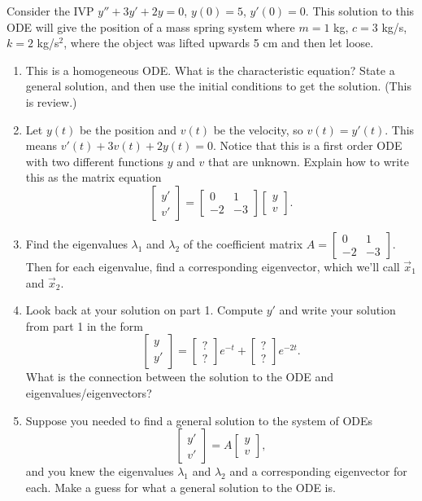 \begin{problem}
 Consider the IVP $y''+3y'+2y=0$, $y(0)=5$, $y'(0)=0$. This solution to this ODE will give the position of a mass spring system where $m=1$ kg, $c=3$ kg/s, $k=2$ kg/s$^2$, where the object was lifted upwards 5 cm and then let loose. 
\begin{enumerate}
\item This is a homogeneous ODE. What is the characteristic equation? State a general solution, and then use the initial conditions to get the solution.  (This is review.)
\item Let $y(t)$ be the position and $v(t)$ be the velocity, so $v(t)=y'(t)$.  This means $v'(t)+3v(t)+2y(t)=0$.  Notice that this is a first order ODE with two different functions $y$ and $v$ that are unknown. Explain how to write this as the matrix equation
$$
\begin{bmatrix}
y'\\v'
\end{bmatrix}
=\begin{bmatrix}
0&1\\-2&-3
\end{bmatrix}
\begin{bmatrix}
y\\v
\end{bmatrix}.
$$
 \item Find the eigenvalues $\lambda_1$ and $\lambda_2$ of the coefficient matrix 
$A=
\begin{bmatrix}
0&1\\-2&-3
\end{bmatrix}
.$ 
Then for each eigenvalue, find a corresponding eigenvector, which we'll call $\vec x_1$ and $\vec x_2$. 
\item Look back at your solution on part 1. Compute $y'$ and write your solution from part 1 in the form 
$$
\begin{bmatrix}
y\\y'
\end{bmatrix}
=
\begin{bmatrix}
?\\?
\end{bmatrix}
e^{-t}+
\begin{bmatrix}
?\\?
\end{bmatrix}
e^{-2t}
.$$
What is the connection between the solution to the ODE and eigenvalues/eigenvectors?  
\item Suppose you needed to find a general solution to the system of ODEs
$$
\begin{bmatrix}
y'\\v'
\end{bmatrix}
=A
\begin{bmatrix}
y\\v
\end{bmatrix}
,$$ and you knew the eigenvalues $\lambda_1$ and $\lambda_2$ and a corresponding eigenvector for each. Make a guess for what a general solution to the ODE is.  
\end{enumerate}
\end{problem}

